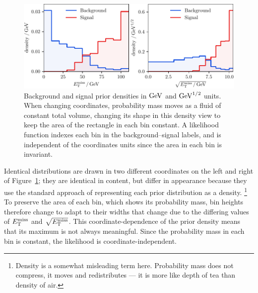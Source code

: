 \begin{figure}[tp]
\centering
\includegraphics[width=\textwidth]{figures/searches_sig_bkg_prior_likelihood.pdf}
\caption[
Background and signal prior densities
]{%
Background and signal prior densities in $\eV[G]$ and $\eV[G]^{1/2}$ units.
When changing coordinates, probability mass moves as a fluid of constant total
volume, changing its shape in this density view to keep the area of the
rectangle in each bin constant.
A likelihood function indexes each bin in the background--signal labels,
and is independent of the coordinates units since the area in each bin is
invariant.
}
\label{fig:searches_sig_bkg_prior_likelihood}
\end{figure}

Identical distributions are drawn in two different coordinates
on the left and right of Figure~\ref{fig:searches_sig_bkg_prior_likelihood};
they are identical in content, but differ in appearance because they use the
standard approach of representing each prior distribution as a density.%
\footnote{%
Density is a somewhat misleading term here.
Probability mass does not compress, it moves and redistributes --- it is more
like depth of tea than density of air.%
}
To preserve the area of each bin, which shows its probability mass,
bin heights therefore change to adapt to their widths that change due to the
differing values of $\met$ and $\sqrt{\met}$.
This coordinate-dependence of the prior density means that its maximum is
not always meaningful.
Since the probability mass in each bin is constant, the likelihood is
coordinate-independent.

